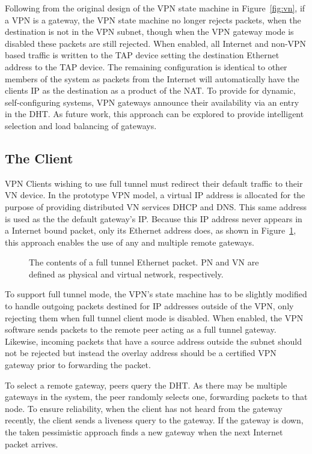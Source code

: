 Following from the original design of the VPN state machine in
Figure~\ref{fig:vn}, if a VPN is a gateway, the VPN state machine no longer
rejects packets, when the destination is not in the VPN subnet, though when the
VPN gateway mode is disabled these packets are still rejected.  When enabled,
all Internet and non-VPN based traffic is written to the TAP device setting the
destination Ethernet address to the TAP device.  The remaining configuration is
identical to other members of the system as packets from the Internet will
automatically have the clients IP as the destination as a product of the NAT.
To provide for dynamic, self-configuring systems, VPN gateways announce their
availability via an entry in the DHT.  As future work, this approach can be
explored to provide intelligent selection and load balancing of gateways.

\subsection{The Client}
VPN Clients wishing to use full tunnel must redirect their default traffic to
their VN device.  In the prototype VPN model, a virtual IP address is allocated
for the purpose of providing distributed VN services DHCP and DNS.  This same
address is used as the the default gateway's IP.  Because this IP address never
appears in a Internet bound packet, only its Ethernet address does, as shown in
Figure~\ref{fig:tunnel_packet}, this approach enables the use of any and
multiple remote gateways.

\begin{figure}
\centering
{}
\caption[The contents of a full tunnel Ethernet packet]{The contents of a full
tunnel Ethernet packet.  PN and VN are defined as physical and virtual network,
respectively.}
\label{fig:tunnel_packet}
\end{figure}

To support full tunnel mode, the VPN's state machine has to be slightly modified
to handle outgoing packets destined for IP addresses outside of the VPN, only
rejecting them when full tunnel client mode is disabled.  When enabled, the VPN
software sends packets to the remote peer acting as a full tunnel gateway.
Likewise, incoming packets that have a source address outside the subnet should
not be rejected but instead the overlay address should be a certified VPN
gateway prior to forwarding the packet.

To select a remote gateway, peers query the DHT.  As there may be multiple
gateways in the system, the peer randomly selects one, forwarding packets to
that node.  To ensure reliability, when the client has not heard from the
gateway recently, the client sends a liveness query to the gateway.  If the
gateway is down, the taken pessimistic approach finds a new gateway when
the next Internet packet arrives.

